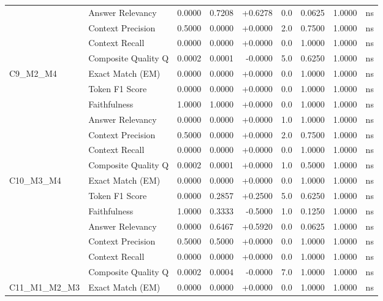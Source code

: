 \begin{table}[p]
\begin{tabular*}{\textwidth}{@{\extracolsep{\fill}} l l r r r r r r c @{}}
                & Answer Relevancy     & 0.0000 & 0.7208 & +0.6278 & 0.0 & 0.0625 & 1.0000 & ns \\
                & Context Precision    & 0.5000 & 0.0000 & +0.0000 & 2.0 & 0.7500 & 1.0000 & ns \\
                & Context Recall       & 0.0000 & 0.0000 & +0.0000 & 0.0 & 1.0000 & 1.0000 & ns \\
                & Composite Quality Q  & 0.0002 & 0.0001 & -0.0000 & 5.0 & 0.6250 & 1.0000 & ns \\
\addlinespace
C9\_M2\_M4      & Exact Match (EM)     & 0.0000 & 0.0000 & +0.0000 & 0.0 & 1.0000 & 1.0000 & ns \\
                & Token F1 Score       & 0.0000 & 0.0000 & +0.0000 & 0.0 & 1.0000 & 1.0000 & ns \\
                & Faithfulness         & 1.0000 & 1.0000 & +0.0000 & 0.0 & 1.0000 & 1.0000 & ns \\
                & Answer Relevancy     & 0.0000 & 0.0000 & +0.0000 & 1.0 & 1.0000 & 1.0000 & ns \\
                & Context Precision    & 0.5000 & 0.0000 & +0.0000 & 2.0 & 0.7500 & 1.0000 & ns \\
                & Context Recall       & 0.0000 & 0.0000 & +0.0000 & 0.0 & 1.0000 & 1.0000 & ns \\
                & Composite Quality Q  & 0.0002 & 0.0001 & +0.0000 & 1.0 & 0.5000 & 1.0000 & ns \\
\addlinespace
C10\_M3\_M4     & Exact Match (EM)     & 0.0000 & 0.0000 & +0.0000 & 0.0 & 1.0000 & 1.0000 & ns \\
                & Token F1 Score       & 0.0000 & 0.2857 & +0.2500 & 5.0 & 0.6250 & 1.0000 & ns \\
                & Faithfulness         & 1.0000 & 0.3333 & -0.5000 & 1.0 & 0.1250 & 1.0000 & ns \\
                & Answer Relevancy     & 0.0000 & 0.6467 & +0.5920 & 0.0 & 0.0625 & 1.0000 & ns \\
                & Context Precision    & 0.5000 & 0.5000 & +0.0000 & 0.0 & 1.0000 & 1.0000 & ns \\
                & Context Recall       & 0.0000 & 0.0000 & +0.0000 & 0.0 & 1.0000 & 1.0000 & ns \\
                & Composite Quality Q  & 0.0002 & 0.0004 & -0.0000 & 7.0 & 1.0000 & 1.0000 & ns \\
\addlinespace
C11\_M1\_M2\_M3 & Exact Match (EM)     & 0.0000 & 0.0000 & +0.0000 & 0.0 & 1.0000 & 1.0000 & ns \\

\end{tabular*}
\end{table}

